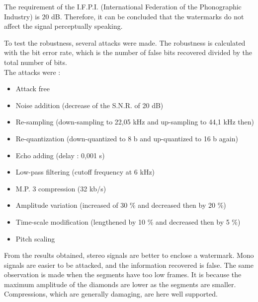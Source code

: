 The requirement of the I.F.P.I. (International Federation of the Phonographic Industry) is 20 dB. Therefore, it can be concluded that the watermarks do not affect the signal perceptually speaking.

To test the robustness, several attacks were made. The robustness is calculated with the bit error rate, which is the number of false bits recovered divided by the total number of bits.\\
The attacks were :

\begin{itemize}
\item Attack free
\item Noise addition (decrease of the S.N.R. of 20 dB)
\item Re-sampling (down-sampling to 22,05 kHz and up-sampling to 44,1 kHz then)
\item Re-quantization (down-quantized to 8 b and up-quantized to 16 b again)
\item Echo adding (delay : 0,001 s)
\item Low-pass filtering (cutoff frequency at 6 kHz)
\item M.P. 3 compression (32 kb/s)
\item Amplitude variation (increased of 30 \% and decreased then by 20 \%)
\item Time-scale modification (lengthened by 10 \% and decreased then by 5 \%)
\item Pitch scaling
\end{itemize}

From the results obtained, stereo signals are better to enclose a watermark. Mono signals are easier to be attacked, and the information recovered is false. The same observation is made when the segments have too low frames. It is because the maximum amplitude of the diamonds are lower as the segments are smaller.\\
Compressions, which are generally damaging, are here well supported.
